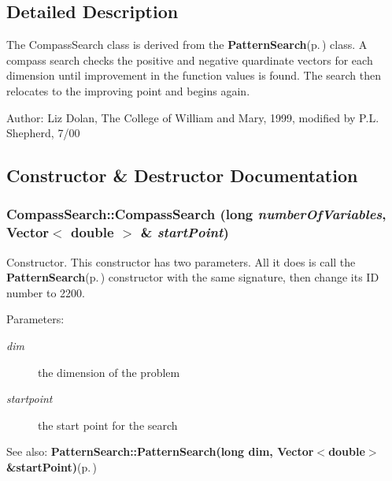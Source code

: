 \subsection{Detailed Description}
The Compass\-Search class is derived from the {\bf Pattern\-Search}{\rm (p.\,\pageref{classPatternSearch})} class. A compass search checks the positive and negative quardinate vectors for each dimension until improvement in the function values is found. The search then relocates to the improving point and begins again.

\begin{Desc}
\item[Author:]Liz Dolan, The College of William and Mary, 1999, modified by P.L. Shepherd, 7/00 \end{Desc}




\subsection{Constructor \& Destructor Documentation}
\subsubsection{\setlength{\rightskip}{0pt plus 5cm}Compass\-Search::Compass\-Search (long {\em number\-Of\-Variables}, Vector$<$ double $>$ \& {\em start\-Point})}\label{classCompassSearch_z3_0}


Constructor. This constructor has two parameters. All it does is call the {\bf Pattern\-Search}{\rm (p.\,\pageref{classPatternSearch})} constructor with the same signature, then change its ID number to 2200.

\begin{Desc}
\item[Parameters:]
\begin{description}
\item[{\em dim}]the dimension of the problem \item[{\em startpoint}]the start point for the search \end{description}
\end{Desc}
\begin{Desc}
\item[See also:]{\bf Pattern\-Search::Pattern\-Search(long dim, Vector$<$double$>$ \&start\-Point)}{\rm (p.\,\pageref{classPatternSearch_z15_0})} \end{Desc}
